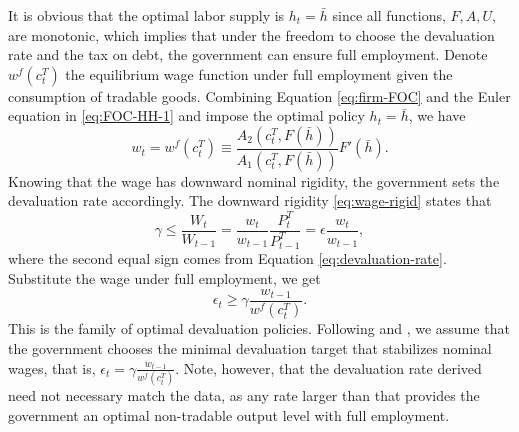 It is obvious that the optimal labor supply is $h_t = \bar{h}$ since all functions, $F, A, U$, are monotonic, which implies that under the freedom to choose the devaluation rate and the tax on debt, the government can ensure full employment. Denote $w^f(c^T_t)$ the equilibrium wage function under full employment given the consumption of tradable goods. Combining Equation \eqref{eq:firm-FOC} and the Euler equation in \eqref{eq:FOC-HH-1} and impose the optimal policy $h_t = \bar{h}$, we have
\begin{equation}
    w_t = w^f(c^T_t) \equiv \frac{A_2(c^T_t, F(\bar{h}))}{A_1(c^T_t, F(\bar{h}))} F'(\bar{h}).
\end{equation}
Knowing that the wage has downward nominal rigidity, the government sets the devaluation rate accordingly. The downward rigidity \eqref{eq:wage-rigid} states that
\begin{equation*}
    \gamma \le \frac{W_t}{W_{t-1}} = \frac{w_t}{w_{t-1}} \frac{P^T_t}{P^T_{t-1}} = \epsilon \frac{w_t}{w_{t-1}},
\end{equation*}
where the second equal sign comes from Equation \eqref{eq:devaluation-rate}. Substitute the wage under full employment, we get
\begin{equation}
    \epsilon_t \ge \gamma \frac{w_{t-1}}{w^f(c^T_t)}.
\end{equation}
This is the family of optimal devaluation policies. Following \citet{Na-18} and \citet*{Hinrichsen_2020-chapter4}, we assume that the government chooses the minimal devaluation target that stabilizes nominal wages, that is, $\epsilon_t = \gamma \frac{w_{t-1}}{w^f(c^T_t)}$.
Note, however, that the devaluation rate derived need not necessary match the data, as any rate larger than that provides the government an optimal non-tradable output level with full employment.